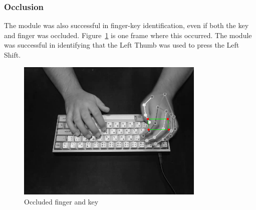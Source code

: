 \documentclass{report}
\begin{document}
\subsubsection{Occlusion}
The module was also successful in finger-key identification, even if both the
key and finger was occluded. Figure~\ref{fig:rd-occluded} is one frame where
this occurred. The module was successful in identifying that the Left Thumb was
used to press the Left Shift.

\begin{figure}[H]
	\centering
	\includegraphics[width=0.8\textwidth]{occluded.png}
	\caption{Occluded finger and key}
	\label{fig:rd-occluded}
\end{figure}
\end{document}
